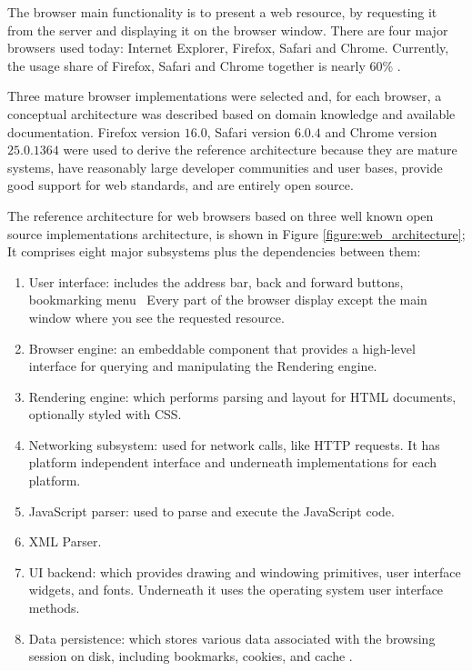 The browser main functionality is to present a web resource, by requesting it from the server and displaying it on the browser window. There are four major browsers used today: Internet Explorer, Firefox, Safari and Chrome. Currently, the usage share of Firefox, Safari and Chrome together is nearly 60\% \cite{Traffic2013}.

Three mature browser implementations were selected and, for each browser, a conceptual architecture was described based on domain knowledge and available documentation. Firefox version $16.0$, Safari version $6.0.4$ and Chrome version $25.0.1364$ were used to derive the reference architecture because they are mature systems, have reasonably large developer communities and user bases, provide good support for web standards, and are entirely open source.

The reference architecture for web browsers based on three well known open source implementations architecture, is shown in Figure \ref{figure:web_architecture}; It comprises eight major subsystems plus the dependencies between them:

\begin{enumerate}
  \item User interface: includes the address bar, back and forward buttons, bookmarking menu \etc\ Every part of the browser display except the main window where you see the requested resource.
  \item Browser engine: an embeddable component that provides a high-level interface for querying and manipulating the Rendering engine.
  \item Rendering engine: which performs parsing and layout for HTML documents, optionally styled with CSS.
  \item Networking subsystem: used for network calls, like HTTP requests. It has platform independent interface and underneath implementations for each platform.
  \item JavaScript parser: used to parse and execute the JavaScript code.
  \item XML Parser.
  \item UI backend: which provides drawing and windowing primitives, user interface widgets, and fonts. Underneath it uses the operating system user interface methods.
  \item Data persistence: which stores various data associated with the browsing session on disk, including bookmarks, cookies, and cache \cite{Grosskurth2005}.
\end{enumerate}

